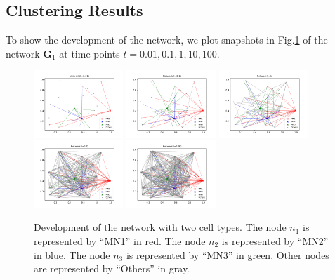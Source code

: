 \subsection{Clustering Results}
To show the development of the network, we plot snapshots in Fig.\ref{Fig: development of network} of the network $\mathbf{G}_1$  at time points $t=0.01, 0.1, 1, 10, 100$.
\begin{figure}[H]
\centering
\includegraphics[width = 0.3\textwidth]{Graphs/t_001.pdf}
\includegraphics[width = 0.3\textwidth]{Graphs/t_01.pdf}
\includegraphics[width = 0.3\textwidth]{Graphs/t_1.pdf}\\
\includegraphics[width = 0.3\textwidth]{Graphs/t_10.pdf}
\includegraphics[width = 0.3\textwidth]{Graphs/t_100.pdf}
\caption{Development of the network with two cell types. The node $n_1$ is represented by ``MN1'' in red. The node $n_2$ is represented by ``MN2'' in blue. The node $n_3$ is represented by ``MN3'' in green. Other nodes are represented by ``Others'' in gray.}
\label{Fig: development of network}
\end{figure}
